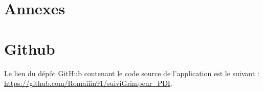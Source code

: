 \documentclass[a4paper, 11pt, french]{article}
\begin{document}
\clearpage
\newpage


\section*{Annexes}

\appendix

\startcontents[sections]


    \section{Github}
    Le lien du dépôt GitHub contenant le code source de l'application est le suivant : \url{https://github.com/Romaiiin91/suiviGrimpeur_PDI}.
      
\end{document}
